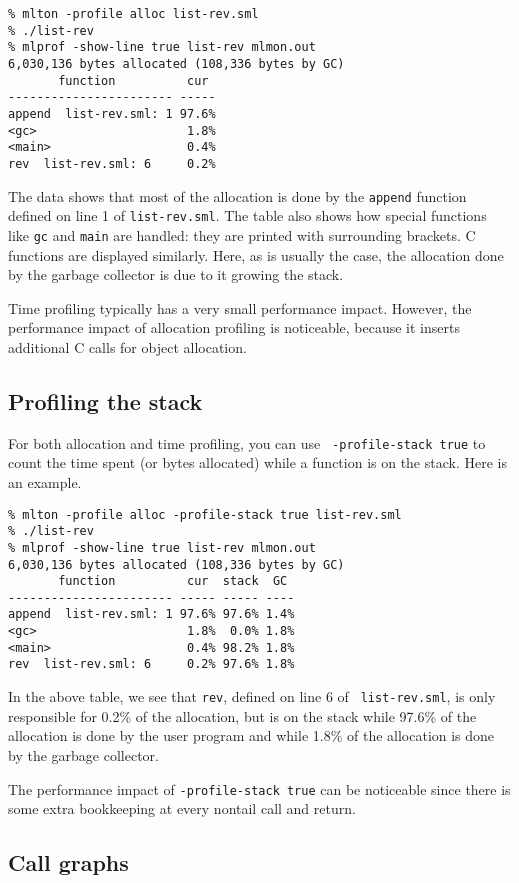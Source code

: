 \begin{verbatim}
% mlton -profile alloc list-rev.sml
% ./list-rev
% mlprof -show-line true list-rev mlmon.out
6,030,136 bytes allocated (108,336 bytes by GC)
       function          cur 
----------------------- -----
append  list-rev.sml: 1 97.6%
<gc>                     1.8%
<main>                   0.4%
rev  list-rev.sml: 6     0.2%
\end{verbatim}
%
The data shows that most of the allocation is done by the {\tt append}
function defined on line 1 of {\tt list-rev.sml}.  The table also
shows how special functions like {\tt gc} and {\tt main} are handled:
they are printed with surrounding brackets.  C functions are displayed
similarly.  Here, as is usually the case, the allocation done by the
garbage collector is due to it growing the stack.

Time profiling typically has a very small performance impact.
However, the performance impact of allocation profiling is noticeable,
because it inserts additional C calls for object allocation.
%
\subsection{Profiling the stack}

For both allocation and time profiling, you can use {\tt
-profile-stack true} to count the time spent (or bytes allocated)
while a function is on the stack.  Here is an example.

\begin{verbatim}
% mlton -profile alloc -profile-stack true list-rev.sml
% ./list-rev
% mlprof -show-line true list-rev mlmon.out
6,030,136 bytes allocated (108,336 bytes by GC)
       function          cur  stack  GC 
----------------------- ----- ----- ----
append  list-rev.sml: 1 97.6% 97.6% 1.4%
<gc>                     1.8%  0.0% 1.8%
<main>                   0.4% 98.2% 1.8%
rev  list-rev.sml: 6     0.2% 97.6% 1.8%
\end{verbatim}
%
In the above table, we see that {\tt rev}, defined on line 6 of {\tt
list-rev.sml}, is only responsible for 0.2\% of the allocation, but is
on the stack while 97.6\% of the allocation is done by the user
program and while 1.8\% of the allocation is done by the garbage
collector.

The performance impact of {\tt -profile-stack true} can be noticeable
since there is some extra bookkeeping at every nontail call and
return.
%
\subsection{Call graphs}

